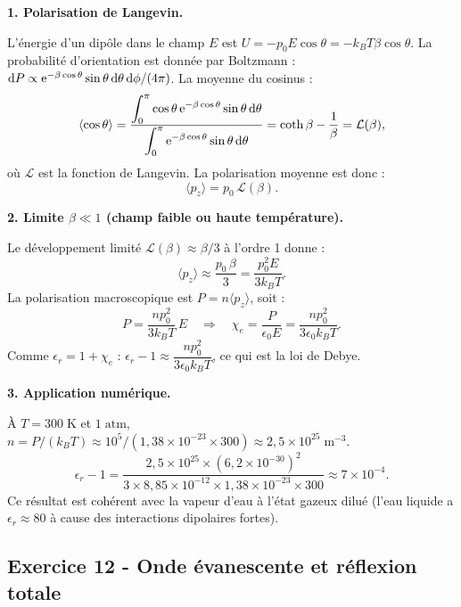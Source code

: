 \documentclass[12pt,a4paper]{article}
\begin{document}
\begin{boitecorrige}

\textbf{1. Polarisation de Langevin.}

L'énergie d'un dipôle dans le champ $E$ est $U = -p_0 E\cos\theta = -k_B T\beta\cos\theta$. La probabilité d'orientation est donnée par Boltzmann : $\mathrm{d} P \propto \mathrm{e}^{-\beta\cos\theta}\sin\theta\,\mathrm{d}\theta\,\mathrm{d}\phi/(4\pi)$. La moyenne du cosinus :
\[
\langle\cos\theta\rangle = \frac{\displaystyle\int_0^\pi \cos\theta\,\mathrm{e}^{-\beta\cos\theta}\sin\theta\,\mathrm{d}\theta}{\displaystyle\int_0^\pi \mathrm{e}^{-\beta\cos\theta}\sin\theta\,\mathrm{d}\theta} = \coth\beta - \frac{1}{\beta} = \mathcal{L}(\beta),
\]
où $\mathcal{L}$ est la fonction de Langevin. La polarisation moyenne est donc :
\[
\langle p_z\rangle = p_0\,\mathcal{L}(\beta).
\]

\textbf{2. Limite $\beta\ll 1$ (champ faible ou haute température).}

Le développement limité $\mathcal{L}(\beta)\approx \beta/3$ à l'ordre 1 donne :
\[
\langle p_z\rangle \approx \frac{p_0\,\beta}{3} = \frac{p_0^2 E}{3k_B T}.
\]
La polarisation macroscopique est $P = n\langle p_z\rangle$, soit :
\[
P = \frac{n p_0^2}{3 k_B T}\,E \quad\Rightarrow\quad \chi_e = \frac{P}{\epsilon_0 E} = \frac{n p_0^2}{3\epsilon_0 k_B T}.
\]
Comme $\epsilon_r = 1 + \chi_e$ : \quad $\epsilon_r - 1 \approx \dfrac{n p_0^2}{3\epsilon_0 k_B T}$, ce qui est la loi de Debye.

\textbf{3. Application numérique.}

À $T=300\;\text{K}$ et $1\;\text{atm}$, $n = P/(k_B T) \approx 10^5/(1{,}38\times 10^{-23}\times 300) \approx 2{,}5\times 10^{25}\;\text{m}^{-3}$.
\[
\epsilon_r - 1 = \frac{2{,}5\times 10^{25}\times(6{,}2\times 10^{-30})^2}{3\times 8{,}85\times 10^{-12}\times 1{,}38\times 10^{-23}\times 300} \approx 7\times 10^{-4}.
\]
Ce résultat est cohérent avec la vapeur d'eau à l'état gazeux dilué (l'eau liquide a $\epsilon_r\approx 80$ à cause des interactions dipolaires fortes).

\end{boitecorrige}

\subsection*{Exercice 12 - Onde évanescente et réflexion totale \niveau{\difficile}}
\end{document}
